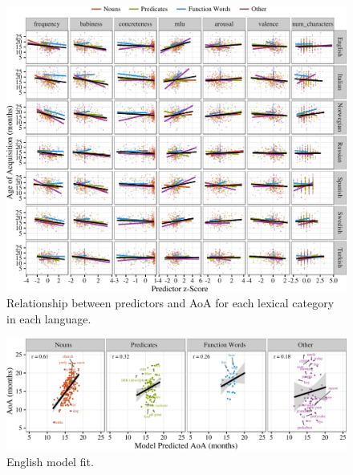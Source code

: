 \documentclass[10pt, letterpaper]{article}
\newenvironment{CodeChunk}{}{}
\begin{document}
\begin{CodeChunk}
\begin{figure}[tb]

{\centering \includegraphics{figs/data-1} 

}

\caption[Relationship between predictors and AoA for each lexical category in each language]{Relationship between predictors and AoA for each lexical category in each language.}\label{fig:data}
\end{figure}
\end{CodeChunk}

\begin{CodeChunk}
\begin{figure}[tb]

{\centering \includegraphics{figs/fit-1} 

}

\caption[English model fit]{English model fit.}\label{fig:fit}
\end{figure}
\end{CodeChunk}
\end{document}
